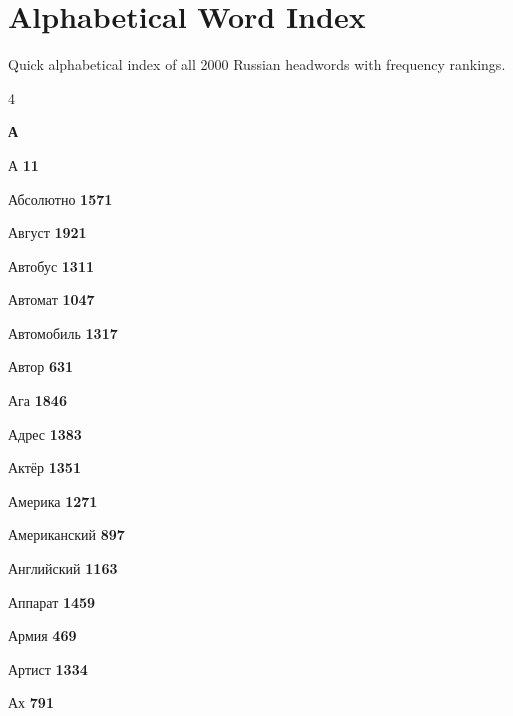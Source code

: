 \chapter*{Alphabetical Word Index}

{\small\color{mutedtext} Quick alphabetical index of all 2000 Russian headwords with frequency rankings.}\par

\vspace{0.8em}
\begin{multicols}{4}
\raggedright\footnotesize

\vspace{0.6em}\noindent\textbf{\normalsize\sffamily\color{primary} А}\par\vspace{0.2em}
\noindent А \dotfill \textbf{\color{secondary} 11}\par
\noindent Абсолютно \dotfill \textbf{\color{secondary} 1571}\par
\noindent Август \dotfill \textbf{\color{secondary} 1921}\par
\noindent Автобус \dotfill \textbf{\color{secondary} 1311}\par
\noindent Автомат \dotfill \textbf{\color{secondary} 1047}\par
\noindent Автомобиль \dotfill \textbf{\color{secondary} 1317}\par
\noindent Автор \dotfill \textbf{\color{secondary} 631}\par
\noindent Ага \dotfill \textbf{\color{secondary} 1846}\par
\noindent Адрес \dotfill \textbf{\color{secondary} 1383}\par
\noindent Актёр \dotfill \textbf{\color{secondary} 1351}\par
\noindent Америка \dotfill \textbf{\color{secondary} 1271}\par
\noindent Американский \dotfill \textbf{\color{secondary} 897}\par
\noindent Английский \dotfill \textbf{\color{secondary} 1163}\par
\noindent Аппарат \dotfill \textbf{\color{secondary} 1459}\par
\noindent Армия \dotfill \textbf{\color{secondary} 469}\par
\noindent Артист \dotfill \textbf{\color{secondary} 1334}\par
\noindent Ах \dotfill \textbf{\color{secondary} 791}\par


\end{multicols}
